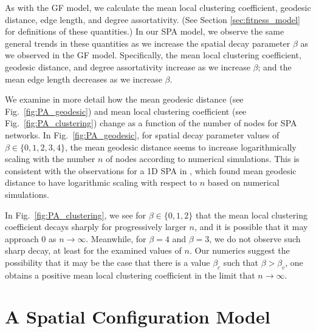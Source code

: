 \documentclass[%
 reprint,
 amsmath,amssymb,
 aps,
]{revtex4-1}
\begin{document}
As with the GF model, we calculate the mean local clustering coefficient, geodesic distance, edge length, and degree assortativity. (See Section \ref{sec:fitness_model} for definitions of these quantities.) In our SPA model, we observe the {\color{red}same general trends in these quantities as we increase the spatial decay parameter $\beta$ as we observed in the GF model.} Specifically, the mean local clustering coefficient, geodesic distance, and degree assortativity increase as we increase $\beta$; and the mean edge length decreases as we increase $\beta$.

We examine in more detail how the mean geodesic distance (see Fig.~\ref{fig:PA_geodesic}) and mean local clustering coefficient (see Fig.~\ref{fig:PA_clustering}) change as a function of the number of nodes for SPA networks. 
In Fig.~\ref{fig:PA_geodesic}, for spatial decay parameter values of $\beta \in \{0, 1, 2, 3, 4\}$, the mean geodesic distance seems to increase logarithmically scaling with the number $n$ of nodes according to numerical simulations. This is consistent with the observations for a 1D SPA in \cite{SPA1}, which found {\color{red}mean geodesic distance to have logarithmic scaling with respect to $n$ based on numerical simulations. }


In Fig.~\ref{fig:PA_clustering}, we see for $\beta \in \{0,1,2\}$ that the mean local clustering coefficient decays sharply for progressively larger $n$, and it is possible that it may approach $0$ as $n \rightarrow\infty$.
Meanwhile, for $\beta=4$ and $\beta=3$, we do not observe such sharp decay, at least for the examined values of $n$.
Our numerics suggest the possibility that it may be the case that there is a value $\beta_c$ such that $\beta > \beta_c$, one obtains a positive mean local clustering coefficient in the limit that $n \rightarrow \infty$.




\section{A Spatial Configuration Model} \label{sec:configuration_model}
\end{document}
